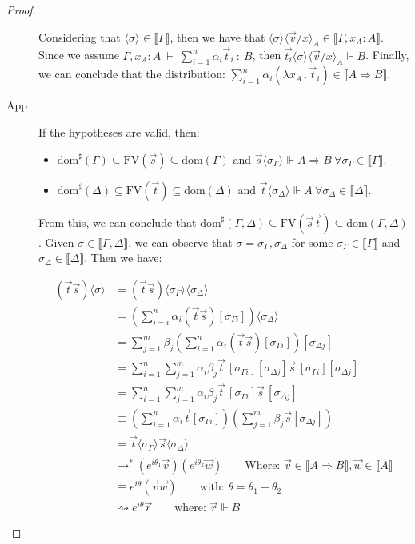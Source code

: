 \documentclass[runningheads,orivec,envcountsame,envcountsect]{llncs}
\newcommand\lra{\longrightarrow}
\newcommand\ansubst[2]{\ensuremath{\langle #1 \rangle_{#2}}}
\newcommand\dom[1]{\mathrm{dom}(#1)}
\newcommand\sdom[1]{\mathrm{dom}^{\sharp}(#1)}
\newcommand\FV[1]{\mathrm{FV}(#1)}
\def\Lam#1#2#3{\lambda#1_{#2}\,{.}\,#3} %
\def\lraneq{\rightsquigarrow}
\def\eval{\lra^*}
\def\Arr{\Rightarrow}
\def\sem#1{\llbracket#1\rrbracket}
\def\TYP#1#2#3{#1~{\vdash}~#2~{:}~#3}
\def\real{\Vdash}
\begin{document}
\begin{proof}
\begin{description}
    Considering that $\ansubst{\sigma}{}\in\sem{\Gamma}$, then we have that $\ansubst{\sigma}{}\ansubst{\vec v/x}{A}\in\sem{\Gamma,x_A:A}$. Since we assume $\TYP{\Gamma, x_A:A}{\sum_{i=1}^{n}\alpha_i\vec t_i}{B}$, then $\vec{t_i}\ansubst{\sigma}{}\ansubst{\vec v/x}{A}\real B$. Finally, we can conclude that the distribution: $\sum_{i=1}^{n}\alpha_i (\Lam{x}{A}{\vec t_i})\in\sem{A\Arr B}$.

    \item[App] If the hypotheses are valid, then:
    \begin{itemize}
        \item $\sdom{\Gamma}\subseteq \FV{\vec s}\subseteq \dom{\Gamma}$ and $\vec s \ansubst{\sigma_\Gamma}{}\Vdash A\Arr B\ \forall \sigma_\Gamma\in\sem{\Gamma}$.
        \item $\sdom{\Delta}\subseteq \FV{\vec t}\subseteq \dom{\Delta}$ and $\vec t\ansubst{\sigma_\Delta}{}\Vdash A\ \forall\sigma_\Delta\in\sem{\Delta}$.
    \end{itemize}
    
    From this, we can conclude that $\sdom{\Gamma,\Delta}\subseteq \FV{\vec s \vec t}\subseteq \dom{\Gamma,\Delta}$. Given $\sigma\in\sem{\Gamma,\Delta}$, we can observe that $\sigma=\sigma_\Gamma,\sigma_\Delta$ for some $\sigma_\Gamma\in\sem{\Gamma}$ and $\sigma_\Delta\in\sem{\Delta}$. Then we have:
    
    \begin{align*}
        (\vec{t}\vec{s})\ansubst{\sigma}{} &= (\vec{t}\vec{s})\ansubst{\sigma_\Gamma}{}\ansubst{\sigma_\Delta}{}\\
        &=(\sum_{i=i}^{n}\alpha_i (\vec{t}\vec{s})[\sigma_{\Gamma i}])\ansubst{\sigma_\Delta}{}\\
        &=\sum_{j=1}^{m} \beta_j (\sum_{i=1}^{n} \alpha_i (\vec{t} \vec{s})[\sigma_{\Gamma i}])[\sigma_{\Delta j}]\\
        &=\sum_{i=1}^{n}\sum_{j=1}^{m} \alpha_i \beta_j \vec{t}\,[\sigma_{\Gamma i}][\sigma_{\Delta j}] \vec{s}\,[\sigma_{\Gamma i}][\sigma_{\Delta j}]\\
        &=\sum_{i=1}^{n}\sum_{j=1}^{m} \alpha_i \beta_j \vec{t}\,[\sigma_{\Gamma i}]\vec{s}\,[\sigma_{\Delta j}]\\
        &\equiv (\sum_{i=1}^{n}\alpha_i\vec{t}[\sigma_{\Gamma i}])(\sum_{j=1}^{m} \beta_j \vec{s}[\sigma_{\Delta j}])\\
        &=\vec{t}\ansubst{\sigma_\Gamma}{} \vec{s}\ansubst{\sigma_\Delta}{}\\
        &\eval (e^{i\theta_{1}} \vec{v}) (e^{i\theta_{2}} \vec{w})\qquad\text{Where: } \vec{v}\in\sem{A\Arr B}, \vec{w}\in\sem{A}\\
        &\equiv e^{i\theta} (\vec{v} \vec{w})\qquad\text{with: }\theta=\theta_1 + \theta_2\\
        &\lraneq e^{i\theta}\vec r\qquad\text{where: } \vec{r}\real B
    \end{align*}
    

\end{description}
\end{proof}
\end{document}
